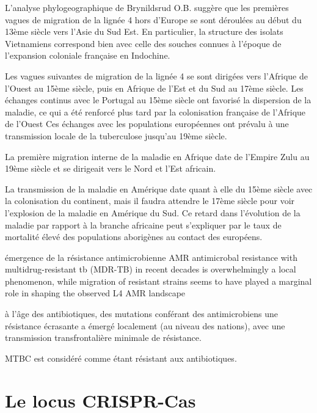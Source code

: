 \documentclass[twoside,a4paper,11pt,frenchb,openany]{report}
\begin{document}

L'analyse phylogeographique de Brynildsrud O.B. suggère que les premières vagues de migration de la lignée 4 hors d'Europe se sont déroulées au début du 13ème siècle vers l'Asie du Sud Est. En particulier, la structure des isolats Vietnamiens correspond bien avec celle des souches connues à l'époque de l'expansion coloniale française en Indochine.

Les vagues suivantes de migration de la lignée 4 se sont dirigées vers l'Afrique de l'Ouest au 15ème siècle, puis en Afrique de l'Est et du Sud au 17ème siècle. Les échanges continus avec le Portugal au 15ème siècle ont favorisé la dispersion de la maladie, ce qui a été renforcé plus tard par la colonisation française de l'Afrique de l'Ouest  Ces échanges avec les populations européennes ont prévalu à une transmission locale de la tuberculose jusqu'au 19ème siècle. 

La première migration interne de la maladie en Afrique date de l'Empire Zulu au 19ème siècle et se dirigeait vers le Nord et l'Est africain.

La transmission de la maladie en Amérique date quant à elle du 15ème siècle avec la colonisation du continent, mais il faudra attendre le 17ème siècle pour voir l'explosion de la maladie en Amérique du Sud. Ce retard dans l'évolution de la maladie par rapport à la branche africaine peut s'expliquer par le taux de mortalité élevé des populations aborigènes au contact des européens.




émergence de la résistance antimicrobienne AMR antimicrobal resistance with multidrug-resistant tb (MDR-TB) in recent decades is overwhelmingly
a local phenomenon, while migration
of resistant strains seems to have played a marginal role in
shaping the observed L4 AMR landscape

à l'âge des antibiotiques, des mutations conférant des antimicrobiens
une résistance écrasante a émergé localement (au niveau des nations), avec une transmission transfrontalière minimale
de résistance.

MTBC est considéré comme étant résistant aux antibiotiques.


\section{Le locus CRISPR-Cas}
\end{document}
